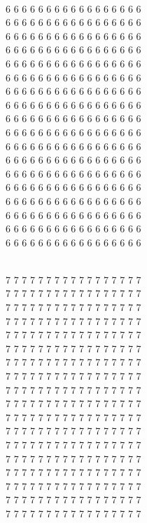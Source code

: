 \documentclass{article}
\begin{document}
\vspace{5mm}
\hspace{2mm} \\
6 6 6 6 6 6 6 6 6 6 6 6 6 6 6 6 6 \\
6 6 6 6 6 6 6 6 6 6 6 6 6 6 6 6 6 \\
6 6 6 6 6 6 6 6 6 6 6 6 6 6 6 6 6 \\
6 6 6 6 6 6 6 6 6 6 6 6 6 6 6 6 6 \\
6 6 6 6 6 6 6 6 6 6 6 6 6 6 6 6 6 \\
6 6 6 6 6 6 6 6 6 6 6 6 6 6 6 6 6 \\
6 6 6 6 6 6 6 6 6 6 6 6 6 6 6 6 6 \\
6 6 6 6 6 6 6 6 6 6 6 6 6 6 6 6 6 \\
6 6 6 6 6 6 6 6 6 6 6 6 6 6 6 6 6 \\
6 6 6 6 6 6 6 6 6 6 6 6 6 6 6 6 6 \\
6 6 6 6 6 6 6 6 6 6 6 6 6 6 6 6 6 \\
6 6 6 6 6 6 6 6 6 6 6 6 6 6 6 6 6 \\
6 6 6 6 6 6 6 6 6 6 6 6 6 6 6 6 6 \\
6 6 6 6 6 6 6 6 6 6 6 6 6 6 6 6 6 \\
6 6 6 6 6 6 6 6 6 6 6 6 6 6 6 6 6 \\
6 6 6 6 6 6 6 6 6 6 6 6 6 6 6 6 6 \\
6 6 6 6 6 6 6 6 6 6 6 6 6 6 6 6 6 \\
6 6 6 6 6 6 6 6 6 6 6 6 6 6 6 6 6 \\

\pagebreak

\vspace{5mm}
\hspace{2mm} \\
7 7 7 7 7 7 7 7 7 7 7 7 7 7 7 7 7 \\
7 7 7 7 7 7 7 7 7 7 7 7 7 7 7 7 7 \\
7 7 7 7 7 7 7 7 7 7 7 7 7 7 7 7 7 \\
7 7 7 7 7 7 7 7 7 7 7 7 7 7 7 7 7 \\
7 7 7 7 7 7 7 7 7 7 7 7 7 7 7 7 7 \\
7 7 7 7 7 7 7 7 7 7 7 7 7 7 7 7 7 \\
7 7 7 7 7 7 7 7 7 7 7 7 7 7 7 7 7 \\
7 7 7 7 7 7 7 7 7 7 7 7 7 7 7 7 7 \\
7 7 7 7 7 7 7 7 7 7 7 7 7 7 7 7 7 \\
7 7 7 7 7 7 7 7 7 7 7 7 7 7 7 7 7 \\
7 7 7 7 7 7 7 7 7 7 7 7 7 7 7 7 7 \\
7 7 7 7 7 7 7 7 7 7 7 7 7 7 7 7 7 \\
7 7 7 7 7 7 7 7 7 7 7 7 7 7 7 7 7 \\
7 7 7 7 7 7 7 7 7 7 7 7 7 7 7 7 7 \\
7 7 7 7 7 7 7 7 7 7 7 7 7 7 7 7 7 \\
7 7 7 7 7 7 7 7 7 7 7 7 7 7 7 7 7 \\
7 7 7 7 7 7 7 7 7 7 7 7 7 7 7 7 7 \\
7 7 7 7 7 7 7 7 7 7 7 7 7 7 7 7 7 \\
\end{document}

